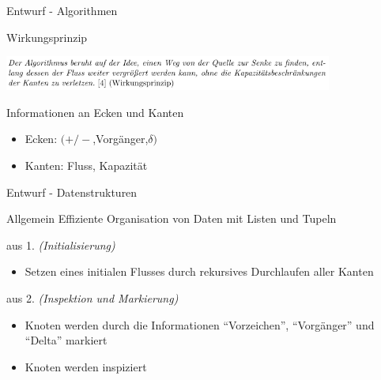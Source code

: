\documentclass{beamer}
\begin{document}
    \begin{frame}{Entwurf - Algorithmen}
        \begin{block}{Wirkungsprinzip}
            \begin{center}
                \includegraphics[width=10.8cm]{../wirkungsprinzip.PNG}
            \end{center}
        \end{block}

        \begin{block}{Informationen an Ecken und Kanten}
            \begin{itemize}
                \item Ecken: $(+/-$,Vorg\"anger,$\delta)$
                \item Kanten: Fluss, Kapazit\"at
            \end{itemize}
        \end{block}
    \end{frame}

    \begin{frame}{Entwurf - Datenstrukturen}
        \begin{block}{Allgemein}
            Effiziente Organisation von Daten mit Listen und Tupeln
        \end{block}
        \begin{block}{aus 1. \textit{(Initialisierung)}}
            \begin{itemize}
                \item Setzen eines initialen Flusses durch rekursives Durchlaufen aller Kanten
            \end{itemize}
        \end{block}
        \begin{block}{aus 2. \textit{(Inspektion und Markierung)}}
            \begin{itemize}
                \item Knoten werden durch die Informationen "`Vorzeichen"', "`Vorg\"anger"' und "`Delta"' markiert
                \item Knoten werden inspiziert
            \end{itemize}
        \end{block}
    \end{frame}
\end{document}
